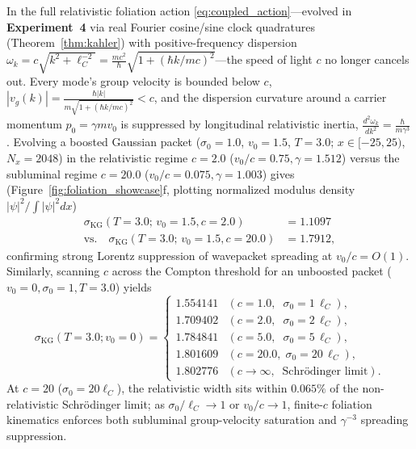 \documentclass[11pt, a4paper]{article}
\theoremstyle{definition}
\begin{document}
In the full relativistic foliation action \eqref{eq:coupled_action}---evolved in \textbf{Experiment~4} via real Fourier cosine/sine clock quadratures (Theorem~\ref{thm:kahler}) with positive-frequency dispersion $\omega_k = c\sqrt{k^2 + \ell_C^{-2}} = \frac{mc^2}{\hbar}\sqrt{1 + (\hbar k / mc)^2}$---the speed of light $c$ no longer cancels out. Every mode's group velocity is bounded below $c$, $|v_g(k)| = \frac{\hbar |k|}{m\sqrt{1 + (\hbar k / mc)^2}} < c$, and the dispersion curvature around a carrier momentum $p_0 = \gamma m v_0$ is suppressed by longitudinal relativistic inertia, $\frac{d^2\omega_k}{dk^2} = \frac{\hbar}{m\gamma^3}$. Evolving a boosted Gaussian packet ($\sigma_0 = 1.0$, $v_0 = 1.5$, $T = 3.0$; $x \in [-25, 25)$, $N_x = 2048$) in the relativistic regime $c = 2.0$ ($v_0/c = 0.75, \gamma = 1.512$) versus the subluminal regime $c = 20.0$ ($v_0/c = 0.075, \gamma = 1.003$) gives (Figure~\ref{fig:foliation_showcase}f, plotting normalized modulus density $|\psi|^2 / \int |\psi|^2 dx$)
\begin{equation}
\label{eq:kg_boosted_comparison}
\begin{aligned}
\sigma_{\text{KG}}(T = 3.0;\, v_0 = 1.5, c = 2.0) &= 1.1097 \\
\text{vs.} \quad \sigma_{\text{KG}}(T = 3.0;\, v_0 = 1.5, c = 20.0) &= 1.7912,
\end{aligned}
\end{equation}
confirming strong Lorentz suppression of wavepacket spreading at $v_0/c = O(1)$. Similarly, scanning $c$ across the Compton threshold for an unboosted packet ($v_0 = 0, \sigma_0 = 1, T = 3.0$) yields
\begin{equation}
\label{eq:kg_c_dispersion}
\sigma_{\text{KG}}(T = 3.0; v_0 = 0) =
\begin{cases}
1.554141 & (c = 1.0, \;\; \sigma_0 = 1\,\ell_C), \\
1.709402 & (c = 2.0, \;\; \sigma_0 = 2\,\ell_C), \\
1.784841 & (c = 5.0, \;\; \sigma_0 = 5\,\ell_C), \\
1.801609 & (c = 20.0, \; \sigma_0 = 20\,\ell_C), \\
1.802776 & (c \to \infty, \;\; \text{Schr\"{o}dinger limit}).
\end{cases}
\end{equation}
At $c = 20$ ($\sigma_0 = 20\ell_C$), the relativistic width sits within $0.065\%$ of the non-relativistic Schr\"{o}dinger limit; as $\sigma_0 / \ell_C \to 1$ or $v_0 / c \to 1$, finite-$c$ foliation kinematics enforces both subluminal group-velocity saturation and $\gamma^{-3}$ spreading suppression.
\end{document}
